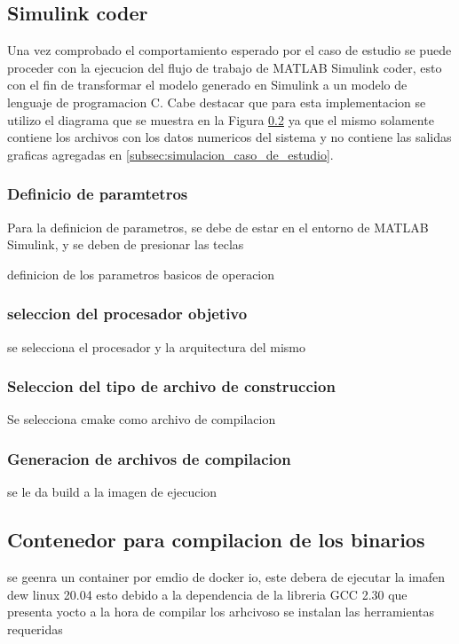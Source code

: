 \subsection{Simulink coder}

Una vez comprobado el comportamiento esperado por el caso de estudio se puede proceder con la ejecucion del flujo de trabajo de MATLAB Simulink coder, esto con el fin de transformar el modelo generado en Simulink a un modelo de lenguaje de programacion C. Cabe destacar que para esta implementacion se utilizo el diagrama que se muestra en la Figura \ref{} ya que el mismo solamente contiene los archivos con los datos numericos del sistema y no contiene las salidas graficas agregadas en \ref{subsec:simulacion_caso_de_estudio}.


\subsubsection{Definicio de paramtetros}

Para la definicion de parametros, se debe de estar en el entorno de MATLAB Simulink, y se deben de presionar las teclas 

definicion de los parametros basicos de operacion

\subsubsection{seleccion del procesador objetivo}

se selecciona el procesador y la arquitectura del mismo

\subsubsection{Seleccion del tipo de archivo de construccion}

Se selecciona cmake como archivo de compilacion 

\subsubsection{Generacion de archivos de compilacion}

se le da build a la imagen de ejecucion

\subsection{Contenedor para compilacion de los binarios}

se geenra un container por emdio de docker io, este debera de ejecutar la imafen dew linux 20.04 esto debido a la dependencia de la libreria GCC 2.30 que presenta yocto a la hora de compilar los arhcivoso
se instalan las herramientas requeridas

